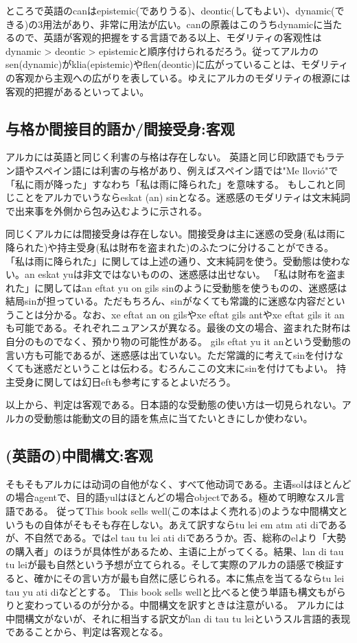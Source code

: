 ところで英語のcanはepistemic(でありうる)、deontic(してもよい)、dynamic(できる)の3用法があり、非常に用法が広い。canの原義はこのうちdynamicに当たるので、英語が客观的把握をする言語である以上、モダリティの客观性はdynamic > deontic > epistemicと順序付けられるだろう。従ってアルカのsen(dynamic)がklia(epistemic)やflen(deontic)に広がっていることは、モダリティの客观から主观への広がりを表している。ゆえにアルカのモダリティの根源には客观的把握があるといってよい。

\subsection{与格か間接目的語か/間接受身:客观}

アルカには英語と同じく利害の与格は存在しない。
英語と同じ印欧語でもラテン語やスペイン語には利害の与格があり、例えばスペイン語では"Me llovió"で「私に雨が降った」すなわち「私は雨に降られた」を意味する。
もしこれと同じことをアルカでいうならeskat (an) sinとなる。迷惑感のモダリティは文末純詞で出来事を外側から包み込むように示される。

同じくアルカには間接受身は存在しない。間接受身は主に迷惑の受身(私は雨に降られた)や持主受身(私は財布を盗まれた)のふたつに分けることができる。
「私は雨に降られた」に関しては上述の通り、文末純詞を使う。受動態は使わない。an eskat yuは非文ではないものの、迷惑感は出せない。
「私は財布を盗まれた」に関してはan eftat yu on gils sinのように受動態を使うものの、迷惑感は結局sinが担っている。ただもちろん、sinがなくても常識的に迷惑な内容だということは分かる。なお、xe eftat an on gilsやxe eftat gils antやxe eftat gils it anも可能である。それぞれニュアンスが異なる。最後の文の場合、盗まれた財布は自分のものでなく、預かり物の可能性がある。
gils eftat yu it anという受動態の言い方も可能であるが、迷惑感は出ていない。ただ常識的に考えてsinを付けなくても迷惑だということは伝わる。むろんここの文末にsinを付けてもよい。
持主受身に関しては幻日eftも参考にするとよいだろう。

以上から、判定は客观である。日本語的な受動態の使い方は一切見られない。アルカの受動態は能動文の目的語を焦点に当てたいときにしか使わない。

\subsection{(英語の)中間構文:客观}

そもそもアルカには动词の自他がなく、すべて他动词である。主语solはほとんどの場合agentで、目的語yulはほとんどの場合objectである。極めて明瞭なスル言語である。
従ってThis book sells well(この本はよく売れる)のような中間構文というもの自体がそもそも存在しない。あえて訳すならtu lei em atm ati diであるが、不自然である。ではel tau tu lei ati diであろうか。否、総称のelより「大勢の購入者」のほうが具体性があるため、主语に上がってくる。結果、lan di tau tu leiが最も自然という予想が立てられる。そして実際のアルカの語感で検証すると、確かにその言い方が最も自然に感じられる。本に焦点を当てるならtu lei tau yu ati diなどとする。
This book sells wellと比べると使う単語も構文もがらりと変わっているのが分かる。中間構文を訳すときは注意がいる。
アルカには中間構文がないが、それに相当する訳文がlan di tau tu leiというスル言語的表现であることから、判定は客观となる。

